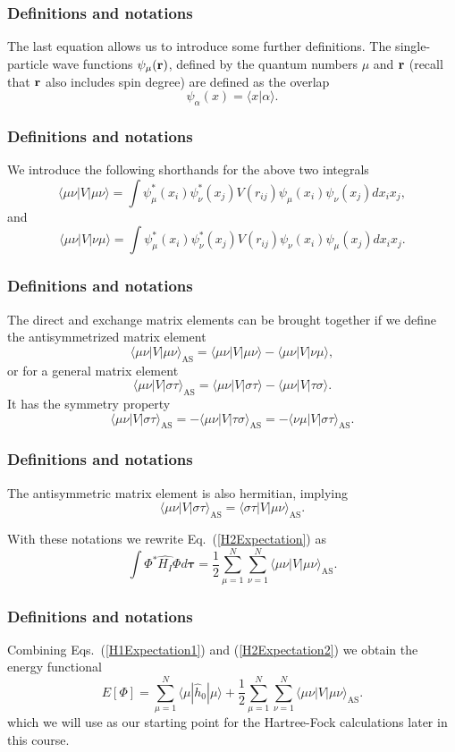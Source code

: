 \documentclass[compress]{beamer}
\begin{document}
\frame
{
  \frametitle{Definitions and notations}
\begin{small}
{\scriptsize
The last equation allows us to  introduce some further definitions.  
The single-particle wave functions $\psi_{\mu}({\bf r})$, defined by the quantum numbers $\mu$ and ${\bf r}$
(recall that ${\bf r}$ also includes spin degree)   are defined as the overlap 
\[
   \psi_{\alpha}(x)  = \langle x | \alpha \rangle .
\]

}
\end{small}
}
\frame
{
  \frametitle{Definitions and notations}
\begin{small}
{\scriptsize
We introduce the following shorthands for the above two integrals
\[
\langle \mu\nu|V|\mu\nu\rangle =  \int \psi_{\mu}^*(x_i)\psi_{\nu}^*(x_j)V(r_{ij})\psi_{\mu}(x_i)\psi_{\nu}(x_j)
    dx_ix_j,
\]
and 
\[
\langle \mu\nu|V|\nu\mu\rangle = \int \psi_{\mu}^*(x_i)\psi_{\nu}^*(x_j)
  V(r_{ij})\psi_{\nu}(x_i)\psi_{\mu}(x_j)
  dx_ix_j.  
\]
}
\end{small}
}
\frame
{
  \frametitle{Definitions and notations}
\begin{small}
{\scriptsize
The direct and exchange matrix elements can be  brought together if we define the antisymmetrized matrix element
\[
\langle \mu\nu|V|\mu\nu\rangle_{\mathrm{AS}}= \langle \mu\nu|V|\mu\nu\rangle-\langle \mu\nu|V|\nu\mu\rangle,
\]
or for a general matrix element  
\[
\langle \mu\nu|V|\sigma\tau\rangle_{\mathrm{AS}}= \langle \mu\nu|V|\sigma\tau\rangle-\langle \mu\nu|V|\tau\sigma\rangle.
\]
It has the symmetry property
\[
\langle \mu\nu|V|\sigma\tau\rangle_{\mathrm{AS}}= -\langle \mu\nu|V|\tau\sigma\rangle_{\mathrm{AS}}=-\langle \nu\mu|V|\sigma\tau\rangle_{\mathrm{AS}}.
\]
}
\end{small}
}
\frame
{
  \frametitle{Definitions and notations}
\begin{small}
{\scriptsize
The antisymmetric matrix element is also hermitian, implying 
\[
\langle \mu\nu|V|\sigma\tau\rangle_{\mathrm{AS}}= \langle \sigma\tau|V|\mu\nu\rangle_{\mathrm{AS}}.
\]

With these notations we rewrite Eq.~(\ref{H2Expectation}) as 
\begin{equation}
  \int \Phi^*\hat{H_I}\Phi d\mathbf{\tau} 
  = \frac{1}{2}\sum_{\mu=1}^N\sum_{\nu=1}^N \langle \mu\nu|V|\mu\nu\rangle_{\mathrm{AS}}.
\label{H2Expectation2}
\end{equation}

}
\end{small}
}
\frame
{
  \frametitle{Definitions and notations}
\begin{small}
{\scriptsize
Combining Eqs.~(\ref{H1Expectation1}) and
(\ref{H2Expectation2}) we obtain the energy functional 
\begin{equation}
  E[\Phi] 
  = \sum_{\mu=1}^N \langle \mu | \hat{h}_0 | \mu \rangle +
  \frac{1}{2}\sum_{{\mu}=1}^N\sum_{{\nu}=1}^N \langle \mu\nu|V|\mu\nu\rangle_{\mathrm{AS}}.
\label{FunctionalEPhi}
\end{equation}
which we will use as our starting point for the Hartree-Fock calculations later in this course. 
}
\end{small}
}
\end{document}
